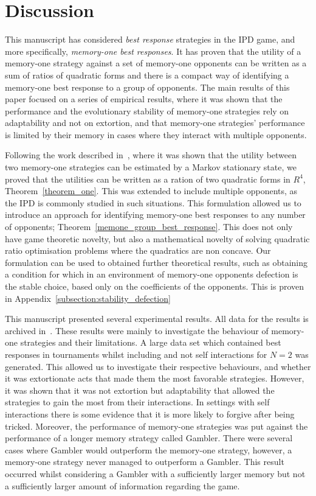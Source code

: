 \documentclass[10pt]{article}
\begin{document}
\section{Discussion}
This manuscript has considered \textit{best response} strategies in the IPD game, and
more specifically, \textit{memory-one best responses}. It has proven that the utility
of a memory-one strategy against a set of memory-one opponents can be written as a sum
of ratios of quadratic forms and there is
a compact way of identifying a memory-one best response to a group of opponents.
The main results of this paper focused on a series of empirical results, where it
was shown that the performance and the evolutionary stability of memory-one
strategies rely on adaptability and not on extortion, and that
memory-one strategies' performance is limited by their memory in cases where
they interact with multiple opponents.

Following the work described in~\cite{Nowak1989}, where it was shown that the
utility between two memory-one strategies can be estimated by a Markov
stationary state, we proved that the utilities can be written as a ration of two
quadratic forms in $R^4$, Theorem~\ref{theorem_one}. This was extended to
include multiple opponents, as the IPD is commonly studied in such situations.
This formulation allowed us to introduce an approach for identifying memory-one
best responses to any number of opponents;
Theorem~\ref{memone_group_best_response}. This does not only have game theoretic
novelty, but also a mathematical novelty of solving quadratic ratio optimisation
problems where the quadratics are non concave. Our formulation can be used to obtained further theoretical results, such as
obtaining a condition for which in an
environment of memory-one opponents defection is the stable choice, based only
on the coefficients of the opponents. This is proven in Appendix~\ref{subsection:stability_defection}

This manuscript presented several experimental results. All data for the results
is archived in~\cite{glynatsi2019}. These results were mainly to investigate the
behaviour of memory-one strategies and their limitations. A large data set which
contained best responses in tournaments whilst including and not self interactions for $N=2$
was generated. This allowed us to investigate their respective behaviours, and
whether it was extortionate acts that made them the most favorable strategies.
However, it was shown that it was not extortion but adaptability that allowed
the strategies to gain the most from their interactions. In settings with self interactions
there
is some evidence that it is more likely to forgive after being tricked.
Moreover, the performance of
memory-one strategies was put against the performance of a longer memory
strategy called Gambler. There were several cases where Gambler would outperform
the memory-one strategy, however, a memory-one strategy never managed to
outperform a Gambler. This result occurred whilst considering a Gambler with a
sufficiently larger memory but not a sufficiently larger amount of information
regarding the game.
\end{document}
